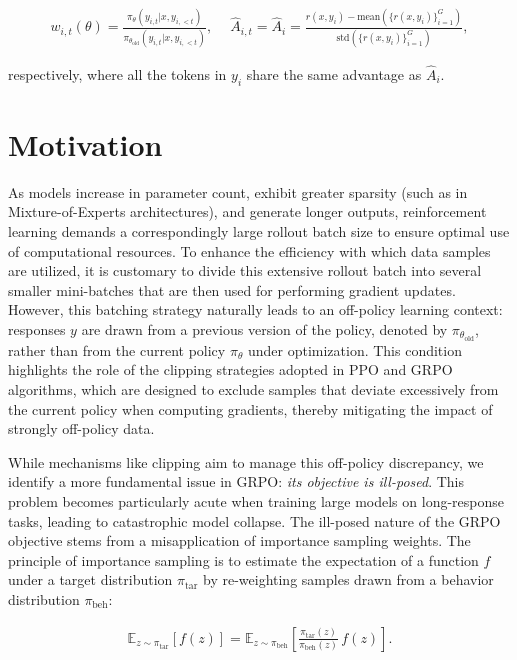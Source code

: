 \begin{align}
    w_{i,t}(\theta)=\frac{ \pi_{\theta} (y_{i,t} | x, y_{i,<t}) }{ \pi_{\theta_\text{old}} (y_{i,t} | x,y_{i,<t})},\quad\ 
    \widehat{A}_{i,t} = \widehat{A}_{i} = \frac{r(x, y_i) - \mathrm{mean} \left( \{ r(x, y_i) \}_{i=1}^G \right) }{ \mathrm{std} \left( \{ r(x, y_i) \}_{i=1}^G \right) },
\end{align}

respectively, where all the tokens in $y_i$ share the same advantage as $\widehat{A}_{i}$.

\section{Motivation}
\label{sec:motivation}

As models increase in parameter count, exhibit greater sparsity (such as in Mixture-of-Experts architectures), and generate longer outputs, reinforcement learning demands a correspondingly large rollout batch size to ensure optimal use of computational resources. To enhance the efficiency with which data samples are utilized, it is customary to divide this extensive rollout batch into several smaller mini-batches that are then used for performing gradient updates. However, this batching strategy naturally leads to an off-policy learning context: responses $y$ are drawn from a previous version of the policy, denoted by $\pi_{\theta_\text{old}}$, rather than from the current policy $\pi_\theta$ under optimization. This condition highlights the role of the clipping strategies adopted in PPO and GRPO algorithms, which are designed to exclude samples that deviate excessively from the current policy when computing gradients, thereby mitigating the impact of strongly off-policy data.

While mechanisms like clipping aim to manage this off-policy discrepancy, we identify a more fundamental issue in GRPO: \textit{its objective is ill-posed}. This problem becomes particularly acute when training large models on long-response tasks, leading to catastrophic model collapse. The ill-posed nature of the GRPO objective stems from a misapplication of importance sampling weights. The principle of importance sampling is to estimate the expectation of a function $f$ under a target distribution $\pi_\text{tar}$ by re-weighting samples drawn from a behavior distribution $\pi_\text{beh}$:

\begin{align}
\mathbb{E}_{z \sim \pi_\text{tar}} \left[ f(z) \right] = \mathbb{E}_{z \sim \pi_\text{beh}} \left[ \frac{ \pi_\text{tar} (z) }{ \pi_\text{beh} (z)} \, f(z) \right].
\end{align}


